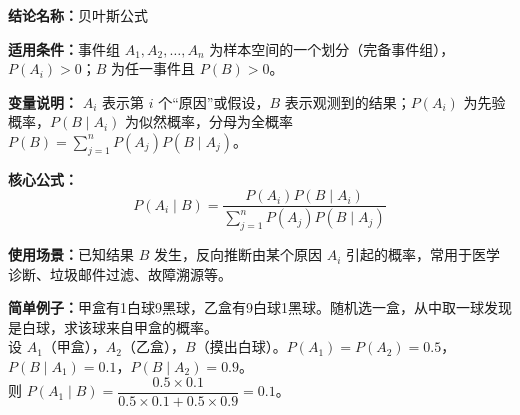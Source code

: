 \textbf{结论名称：}贝叶斯公式

\textbf{适用条件：}事件组 $A_1,A_2,\ldots,A_n$ 为样本空间的一个划分（完备事件组），$P(A_i)>0$；$B$ 为任一事件且 $P(B)>0$。

\textbf{变量说明：} $A_i$ 表示第 $i$ 个“原因”或假设，$B$ 表示观测到的结果；$P(A_i)$ 为先验概率，$P(B\mid A_i)$ 为似然概率，分母为全概率 $P(B)=\sum_{j=1}^{n}P(A_j)P(B\mid A_j)$。

\textbf{核心公式：}
\[
\boxed{P(A_i\mid B)=\frac{P(A_i)P(B\mid A_i)}{\displaystyle\sum_{j=1}^{n}P(A_j)P(B\mid A_j)}}
\]

\textbf{使用场景：}已知结果 $B$ 发生，反向推断由某个原因 $A_i$ 引起的概率，常用于医学诊断、垃圾邮件过滤、故障溯源等。

\textbf{简单例子：}甲盒有1白球9黑球，乙盒有9白球1黑球。随机选一盒，从中取一球发现是白球，求该球来自甲盒的概率。\\
设 $A_1$（甲盒），$A_2$（乙盒），$B$（摸出白球）。$P(A_1)=P(A_2)=0.5$，$P(B\mid A_1)=0.1$，$P(B\mid A_2)=0.9$。\\
则 $P(A_1\mid B)=\dfrac{0.5\times 0.1}{0.5\times 0.1+0.5\times 0.9}=0.1$。